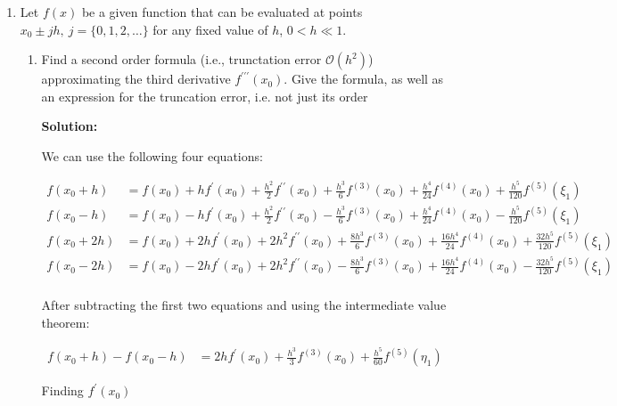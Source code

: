 \documentclass[12pt]{article}
\newcommand{\pprime}{\prime \prime}
\newcommand{\BigO}[1]{\mathcal{O}\left( #1 \right)}
\begin{document}
\begin{enumerate}
\item Let $f(x)$ be a given function that can be evaluated at points $x_{0} \pm jh,\ j=\{0,1,2,\ldots\}$ for any fixed value of $h$, $0 < h \ll 1$.

\begin{enumerate}
\item Find a second order formula (i.e., trunctation error $\BigO{h^{2}}$) approximating the third derivative $f^{\prime \prime \prime}(x_{0})$. Give the formula, as well as an expression for the truncation error, i.e. not just its order

{\bf Solution:}

We can use the following four equations:

\begin{align*}
f(x_{0}+h) &= f(x_{0}) + hf^{\prime}(x_{0}) + \frac{h^{2}}{2}f^{\pprime}(x_0) + \frac{h^{3}}{6}f^{(3)}(x_{0}) + \frac{h^{4}}{24}f^{(4)}(x_{0}) + \frac{h^{5}}{120}f^{(5)}(\xi_{1})\\
f(x_{0}-h) &= f(x_{0}) - hf^{\prime}(x_{0}) + \frac{h^{2}}{2}f^{\pprime}(x_0) - \frac{h^{3}}{6}f^{(3)}(x_{0}) + \frac{h^{4}}{24}f^{(4)}(x_{0}) - \frac{h^{5}}{120}f^{(5)}(\xi_{1})\\
f(x_{0}+2h) &= f(x_{0}) + 2hf^{\prime}(x_{0}) + 2h^{2}f^{\pprime}(x_0) + \frac{8h^{3}}{6}f^{(3)}(x_{0}) + \frac{16h^{4}}{24}f^{(4)}(x_{0}) + \frac{32h^{5}}{120}f^{(5)}(\xi_{1})\\
f(x_{0}-2h) &= f(x_{0}) - 2hf^{\prime}(x_{0}) + 2h^{2}f^{\pprime}(x_0) - \frac{8h^{3}}{6}f^{(3)}(x_{0}) + \frac{16h^{4}}{24}f^{(4)}(x_{0}) - \frac{32h^{5}}{120}f^{(5)}(\xi_{1})\\
\end{align*}

After subtracting the first two equations and using the intermediate value theorem:

\begin{align*}
f(x_{0} + h) - f(x_{0} - h) &= 2hf^{\prime}(x_{0}) + \frac{h^{3}}{3}f^{(3)}(x_{0}) + \frac{h^{5}}{60}f^{(5)}(\eta_{1})
\end{align*}

Finding $f^{\prime}(x_{0})$


\end{enumerate}
\end{enumerate}
\end{document}
